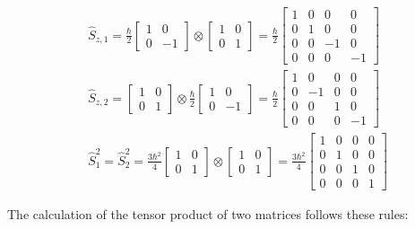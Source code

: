 \documentclass{article}
\begin{document}
\begin{enumerate}
\begin{enumerate}
{\[
\begin{aligned}
& \hat{S}_{z, 1} = \frac{\hbar}{2} \left[\begin{array}{cc}
1 & 0 \\
0 & -1
\end{array}\right] \otimes \left[\begin{array}{cc}
1 & 0 \\
0 & 1
\end{array}\right] = \frac{\hbar}{2} \left[\begin{array}{cccc}
1 & 0 & 0 & 0 \\
0 & 1 & 0 & 0 \\
0 & 0 & -1 & 0 \\
0 & 0 & 0 & -1
\end{array}\right] \\
& \hat{S}_{z, 2} = \left[\begin{array}{cc}
1 & 0 \\
0 & 1
\end{array}\right] \otimes \frac{\hbar}{2} \left[\begin{array}{cc}
1 & 0 \\
0 & -1
\end{array}\right] = \frac{\hbar}{2} \left[\begin{array}{cccc}
1 & 0 & 0 & 0 \\
0 & -1 & 0 & 0 \\
0 & 0 & 1 & 0 \\
0 & 0 & 0 & -1
\end{array}\right] \\
& \hat{S}_{1}^{2} = \hat{S}_{2}^{2} = \frac{3 \hbar^{2}}{4} \left[\begin{array}{ll}
1 & 0 \\
0 & 1
\end{array}\right] \otimes \left[\begin{array}{ll}
1 & 0 \\
0 & 1
\end{array}\right] = \frac{3 \hbar^{2}}{4} \left[\begin{array}{cccc}
1 & 0 & 0 & 0 \\
0 & 1 & 0 & 0 \\
0 & 0 & 1 & 0 \\
0 & 0 & 0 & 1
\end{array}\right]
\end{aligned}
\]

The calculation of the tensor product of two matrices follows these rules:

}
\end{enumerate}
\end{enumerate}
\end{document}
